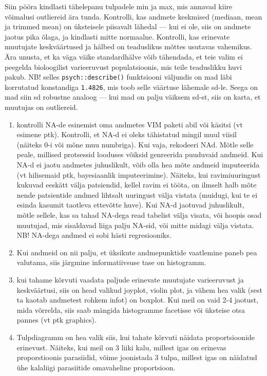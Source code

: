 \documentclass[]{book}
\begin{document}
Siin pööra kindlasti tähelepanu tulpadele min ja max, mis annavad kiire võimalusi outliereid ära tunda. Kontrolli, kas andmete keskmised (mediaan, mean ja trimmed mean) on üksteisele piisavalt lähedal --- kui ei ole, siis on andmete jaotus pika õlaga, ja kindlasti mitte normaalne.
Kontrolli, kas erinevate muutujate keskväärtused ja hälbed on teaduslikus mõttes usutavas vahemikus.
Ära unusta, et ka väga väike standardhälve võib tähendada, et teie valim ei peegelda bioloogilist varieeruvust populatsioonis, mis teile teaduslikku huvi pakub.
NB! selles \texttt{psych::describe()} funktsiooni väljundis on mad läbi korrutatud konstandiga \texttt{1.4826}, mis toob selle väärtuse lähemale sd-le.
Seega on mad siin sd robustne analoog --- kui mad on palju väiksem sd-st, siis on karta, et muutujas on outliereid.

\begin{enumerate}
\def\labelenumi{\arabic{enumi}.}
\setcounter{enumi}{2}
\item
  kontrolli NA-de esinemist oma andmetes VIM paketi abil või käsitsi (vt esimene ptk). Kontrolli, et NA-d ei oleks tähistatud mingil muul viisil (näiteks 0-i või mõne muu numbriga). Kui vaja, rekodeeri NAd. Mõtle selle peale, millised protsessid looduses võiksid genreerida puuduvaid andmeid. Kui NA-d ei jaotu andmetes juhuslikult, võib olla hea mõte andmeid imputeerida (vt hilisemaid ptk, bayesiaanlik imputeerimine). Näiteks, kui ravimiuuringust kukuvad eeskätt välja patsiendid, kellel ravim ei tööta, on ilmselt halb mõte nende patsientide andmed lihtsalt uuringust välja vistata (muidugi, kui te ei esinda kasumit taotleva ettevõtte huve). Kui NA-d jaotuvad juhuslikult, mõtle sellele, kas sa tahad NA-dega read tabelist välja visata, või hoopis osad muutujad, mis sisaldavad liiga palju NA-sid, või mitte midagi välja vistata. NB! NA-dega andmed ei sobi hästi regresiooniks.
\item
  Kui andmeid on nii palju, et üksikute andmepunktide vaatlemine paneb pea valutama, siis järgmine informatiivsuse tase on histogramm.
\item
  kui tahame kõrvuti vaadata paljude erinevate muutujate varieeruvust ja keskväärtusi, siis on head valikud joyplot, violin plot, ja vähem hea valik (sest ta kaotab andmetest rohkem infot) on boxplot. Kui meil on vaid 2-4 jaotust, mida võrrelda, siis saab mängida histogramme facetisse või üksteise otsa pannes (vt ptk graphics).
\item
  Tulpdiagramm on hea valik siis, kui tahate kõrvuti näidata proportsioonide erinevust. Näiteks, kui meil on 3 liiki kalu, millest igas on erinevas proporstioonis parasiidid, võime joonistada 3 tulpa, millest igas on näidatud ühe kalaliigi parasiitide omavaheline proportsioon.

\end{enumerate}
\end{document}

